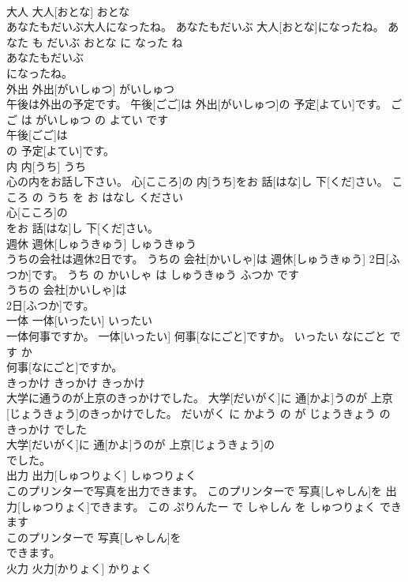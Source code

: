 \documentclass[8pt]{extreport}
\begin{document}
\begin{CJK}{UTF8}{min}
\\	大人	大人[おとな]	おとな	
\\	あなたもだいぶ大人になったね。	あなたもだいぶ 大人[おとな]になったね。	あなた も だいぶ おとな に なった ね	
\\	あなたもだいぶ
\\	になったね。			
\\	外出	外出[がいしゅつ]	がいしゅつ	
\\	午後は外出の予定です。	午後[ごご]は 外出[がいしゅつ]の 予定[よてい]です。	ごご は がいしゅつ の よてい です	
\\	午後[ごご]は
\\	の 予定[よてい]です。			
\\	内	内[うち]	うち	
\\	心の内をお話し下さい。	心[こころ]の 内[うち]をお 話[はな]し 下[くだ]さい。	こころ の うち を お はなし ください	
\\	心[こころ]の
\\	をお 話[はな]し 下[くだ]さい。			
\\	週休	週休[しゅうきゅう]	しゅうきゅう	
\\	うちの会社は週休2日です。	うちの 会社[かいしゃ]は 週休[しゅうきゅう] 2日[ふつか]です。	うち の かいしゃ は しゅうきゅう ふつか です	
\\	うちの 会社[かいしゃ]は
\\	2日[ふつか]です。			
\\	一体	一体[いったい]	いったい	
\\	一体何事ですか。	一体[いったい] 何事[なにごと]ですか。	いったい なにごと です か	
\\	何事[なにごと]ですか。			
\\	きっかけ	きっかけ	きっかけ	
\\	大学に通うのが上京のきっかけでした。	大学[だいがく]に 通[かよ]うのが 上京[じょうきょう]のきっかけでした。	だいがく に かよう の が じょうきょう の きっかけ でした	
\\	大学[だいがく]に 通[かよ]うのが 上京[じょうきょう]の
\\	でした。			
\\	出力	出力[しゅつりょく]	しゅつりょく	
\\	このプリンターで写真を出力できます。	このプリンターで 写真[しゃしん]を 出力[しゅつりょく]できます。	この ぷりんたー で しゃしん を しゅつりょく できます	
\\	このプリンターで 写真[しゃしん]を
\\	できます。			
\\	火力	火力[かりょく]	かりょく	

\end{CJK}
\end{document}
